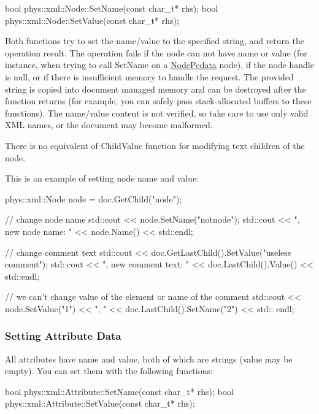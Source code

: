 \begin{DoxyCode}
 bool phys::xml::Node::SetName(const char_t* rhs);
 bool phys::xml::Node::SetValue(const char_t* rhs);
\end{DoxyCode}
 Both functions try to set the name/value to the specified string, and return the operation result. The operation fails if the node can not have name or value (for instance, when trying to call SetName on a \hyperlink{namespacephys_1_1xml_a668b0cc666a9d49f7c7222a7552115d3}{NodePcdata} node), if the node handle is null, or if there is insufficient memory to handle the request. The provided string is copied into document managed memory and can be destroyed after the function returns (for example, you can safely pass stack-\/allocated buffers to these functions). The name/value content is not verified, so take care to use only valid XML names, or the document may become malformed. \par
 \par
 There is no equivalent of ChildValue function for modifying text children of the node. \par
 \par
 This is an example of setting node name and value: 
\begin{DoxyCode}
 phys::xml::Node node = doc.GetChild("node");

 // change node name
 std::cout << node.SetName("notnode");
 std::cout << ", new node name: " << node.Name() << std::endl;

 // change comment text
 std::cout << doc.GetLastChild().SetValue("useless comment");
 std::cout << ", new comment text: " << doc.LastChild().Value() << std::endl;

 // we can't change value of the element or name of the comment
 std::cout << node.SetValue("1") << ", " << doc.LastChild().SetName("2") << std::
      endl;
\end{DoxyCode}
 \hypertarget{XMLManual_XMLModifyingAttributeData}{}\subsubsection{Setting Attribute Data}\label{XMLManual_XMLModifyingAttributeData}
All attributes have name and value, both of which are strings (value may be empty). You can set them with the following functions: 
\begin{DoxyCode}
 bool phys::xml::Attribute::SetName(const char_t* rhs);
 bool phys::xml::Attribute::SetValue(const char_t* rhs);
\end{DoxyCode}

